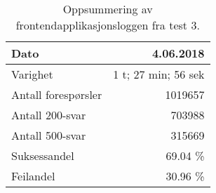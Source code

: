 \begin{table}[hbtp]
  \caption{Oppsummering av frontend\-applikasjons\-loggen fra test 3.}
  \begin{center}
    \begin{tabular}{ | l | r |}
      \hline
      Dato & 4.06.2018 \\ \hline
      Varighet & 1 t; 27 min; 56 sek \\ \hline
      Antall forespørsler & 1019657 \\ \hline
      Antall 200-svar & 703988 \\ \hline
      Antall 500-svar & 315669 \\ \hline
      Suksessandel & 69.04 \% \\ \hline
      Feilandel & 30.96 \% \\ \hline
    \end{tabular}
  \end{center}
  \label{frontend3}
\end{table}
